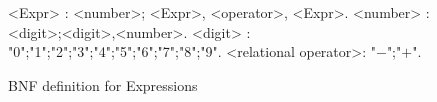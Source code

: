 \begin{figure}[H]
\begin{grammar}
<Expr>   \hspace{53pt} : <number>; <Expr>, <operator>, <Expr>.
<number> \hspace{42pt} : <digit>;<digit>,<number>.
<digit> \hspace{55pt} : "0";"1";"2";"3";"4";"5";"6";"7";"8";"9".
<relational operator>: "$-$";"$+$".
\end{grammar}
\caption{BNF definition for Expressions}
\label{grammar:bnf:expr}
\end{figure}
